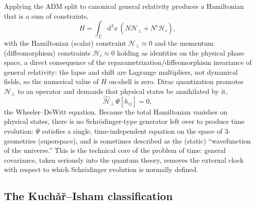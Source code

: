 \documentclass[11pt]{article}
\newcommand{\dd}{\mathrm{d}}
\begin{document}
Applying the ADM split to canonical general relativity produces a Hamiltonian that is a sum of constraints,
\begin{equation}
H = \int_\Sigma \dd^3x \, \left( N \mathcal{H}_\perp + N^i \mathcal{H}_i \right),
\end{equation}
with the Hamiltonian (scalar) constraint $\mathcal{H}_\perp\approx 0$ and the momentum (diffeomorphism) constraints $\mathcal{H}_i\approx 0$ holding as identities on the physical phase space, a direct consequence of the reparametrization/diffeomorphism invariance of general relativity: the lapse and shift are Lagrange multipliers, not dynamical fields, so the numerical value of $H$ on-shell is zero. Dirac quantization promotes $\mathcal{H}_\perp$ to an operator and demands that physical states be annihilated by it,
\begin{equation}
\hat{\mathcal{H}}_\perp\,\Psi[h_{ij}] = 0,
\end{equation}
the Wheeler--DeWitt equation. Because the total Hamiltonian vanishes on physical states, there is no Schr\"odinger-type generator left over to produce time evolution: $\Psi$ satisfies a single, time-independent equation on the space of 3-geometries (superspace), and is sometimes described as the (static) ``wavefunction of the universe.'' This is the technical core of the problem of time: general covariance, taken seriously into the quantum theory, removes the external clock with respect to which Schr\"odinger evolution is normally defined.

\subsection{The Kuch\v{a}\v{r}--Isham classification}
\end{document}
